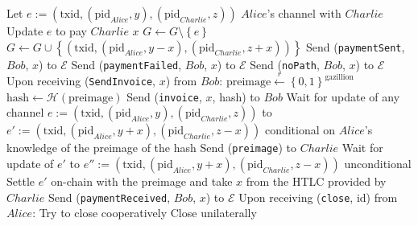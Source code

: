 \begin{algorithmic}[1]
          \State Let $e := \left(\mathrm{txid}, \left(\mathrm{pid}_{Alice}, y\right),
          \left(\mathrm{pid}_{Charlie}, z\right)\right)$ $Alice$'s channel with $Charlie$
          \State Update $e$ to pay $Charlie$ $x$ 
          \State $G \leftarrow G \setminus \left\{e\right\}$
          \State $G \leftarrow G \cup \left\{\left(\mathrm{txid},
          \left(\mathrm{pid}_{Alice}, y - x\right), \left(\mathrm{pid}_{Charlie}, z +
          x\right)\right)\right\}$
          \State Send (\texttt{paymentSent}, $Bob$, $x$) to $\mathcal{E}$
        \Else
          \State Send (\texttt{paymentFailed}, $Bob$, $x$) to $\mathcal{E}$
        \EndIf
      \Else
        \State Send (\texttt{noPath}, $Bob$, $x$) to $\mathcal{E}$
      \EndIf
    \State
    \State Upon receiving (\texttt{SendInvoice}, $x$) from $Bob$:
      \State $\mathrm{preimage} \overset{r}{\leftarrow}
      \left\{0,1\right\}^{\mathrm{gazillion}}$
      \State $\mathrm{hash} \leftarrow \mathcal{H}\left(\mathrm{preimage}\right)$
      \State Send (\texttt{invoice}, $x$, hash) to $Bob$
      \State Wait for update of any channel $e := \left(\mathrm{txid},
      \left(\mathrm{pid}_{Alice}, y\right), \left(\mathrm{pid}_{Charlie}, z\right)\right)$
      to $e' := \left(\mathrm{txid}, \left(\mathrm{pid}_{Alice}, y + x\right),
      \left(\mathrm{pid}_{Charlie}, z - x\right)\right)$ conditional on $Alice$'s
      knowledge of the preimage of the hash
      \State Send (\texttt{preimage}) to $Charlie$
      \State Wait for update of $e'$ to $e'' := \left(\mathrm{txid},
      \left(\mathrm{pid}_{Alice}, y + x\right), \left(\mathrm{pid}_{Charlie}, z -
      x\right)\right)$ unconditional
        \State Settle $e'$ on-chain with the preimage and take $x$ from the HTLC provided
        by $Charlie$
      \EndIf
      \State Send (\texttt{paymentReceived}, $Bob$, $x$) to $\mathcal{E}$
    \State
    \State Upon receiving (\texttt{close}, id) from $Alice$:
        \State Try to close cooperatively 
         
          \State Close unilaterally 
        \EndIf
      \EndIf
  \end{algorithmic}
\hrulefill
\ \\ 
  \label{alg:temp:formalfledger}
